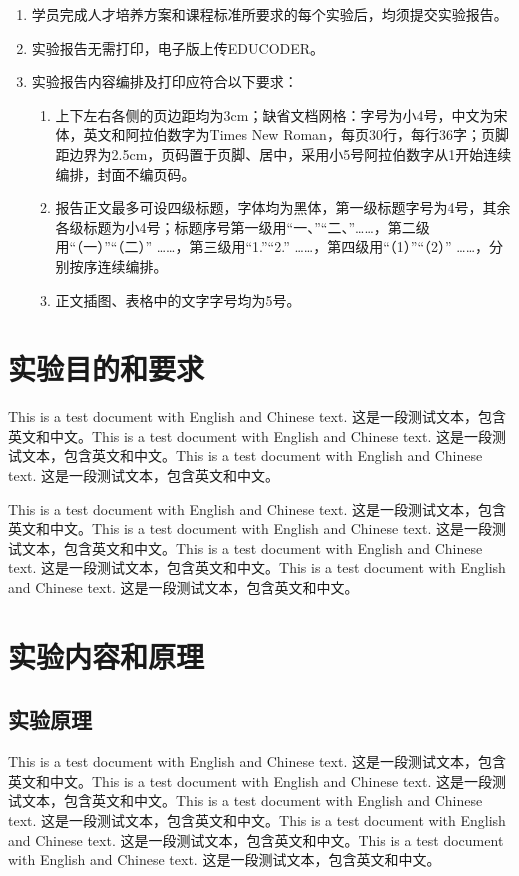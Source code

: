 \documentclass[a4paper,12pt]{article}
\begin{document}
\vspace*{1\baselineskip} 

\begin{enumerate}
\songti{}
\item 学员完成人才培养方案和课程标准所要求的每个实验后，均须提交实验报告。
\item 实验报告无需打印，电子版上传EDUCODER。
\item 实验报告内容编排及打印应符合以下要求：
    \begin{enumerate}
    \fangsong{}
    \item 上下左右各侧的页边距均为3cm；缺省文档网格：字号为小4号，中文为宋体，英文和阿拉伯数字为Times New Roman，每页30行，每行36字；页脚距边界为2.5cm，页码置于页脚、居中，采用小5号阿拉伯数字从1开始连续编排，封面不编页码。
    \item 报告正文最多可设四级标题，字体均为黑体，第一级标题字号为4号，其余各级标题为小4号；标题序号第一级用“一、”“二、”……，第二级用“（一）”“（二）” ……，第三级用“1.”“2.” ……，第四级用“（1）”“（2）” ……，分别按序连续编排。
    \item 正文插图、表格中的文字字号均为5号。
    \end{enumerate}
\end{enumerate}

\newpage

\section{实验目的和要求}
This is a test document with English and Chinese text. 这是一段测试文本，包含英文和中文。This is a test document with English and Chinese text. 这是一段测试文本，包含英文和中文。This is a test document with English and Chinese text. 这是一段测试文本，包含英文和中文。

This is a test document with English and Chinese text. 这是一段测试文本，包含英文和中文。This is a test document with English and Chinese text. 这是一段测试文本，包含英文和中文。This is a test document with English and Chinese text. 这是一段测试文本，包含英文和中文。This is a test document with English and Chinese text. 这是一段测试文本，包含英文和中文。

\section{实验内容和原理}
\subsection{实验原理}
This is a test document with English and Chinese text. 这是一段测试文本，包含英文和中文。This is a test document with English and Chinese text. 这是一段测试文本，包含英文和中文。This is a test document with English and Chinese text. 这是一段测试文本，包含英文和中文。This is a test document with English and Chinese text. 这是一段测试文本，包含英文和中文。This is a test document with English and Chinese text. 这是一段测试文本，包含英文和中文。
\end{document}
